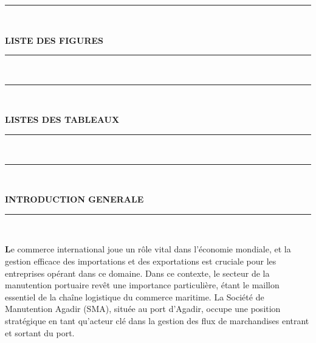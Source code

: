 \documentclass[11pt]{article}
\begin{document}
\newpage
\begin{center}
    {\color{cyan}\rule{\linewidth}{0.5mm}} \\[1.5ex]
    
    {\color{cyan}\Huge\bfseries LISTE DES FIGURES\par}
    
    {\color{cyan}\rule{\linewidth}{0.5mm}} \\[2ex]
    
\end{center}
\listoffigures %

\newpage
\begin{center}
    {\color{cyan}\rule{\linewidth}{0.5mm}} \\[1.5ex]
    
    {\color{cyan}\Huge\bfseries LISTES DES TABLEAUX\par}
    
    {\color{cyan}\rule{\linewidth}{0.5mm}} \\[2ex]
    
\end{center}
\listoftables %


\newpage
\begin{center}
    {\color{cyan}\rule{\linewidth}{0.5mm}} \\[1.5ex]
    
    {\color{cyan}\Huge\bfseries INTRODUCTION GENERALE \par}
    
    {\color{cyan}\rule{\linewidth}{0.5mm}} \\[2ex]
    
    
\end{center}

\textbf{L}e commerce international joue un rôle vital dans l'économie mondiale, et la gestion efficace des importations et des exportations est cruciale pour les entreprises opérant dans ce domaine. Dans ce contexte, le secteur de la manutention portuaire revêt une importance particulière, étant le maillon essentiel de la chaîne logistique du commerce maritime. La Société de Manutention Agadir (SMA), située au port d'Agadir, occupe une position stratégique en tant qu'acteur clé dans la gestion des flux de marchandises entrant et sortant du port.\vspace{0.5cm}
\end{document}
